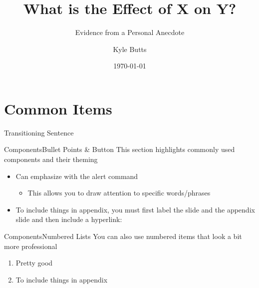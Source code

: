 \documentclass[aspectratio=43]{beamer}
\title{What is the Effect of X on Y?}
\subtitle{Evidence from a Personal Anecdote}
\date{\today}
\author{Kyle Butts}
\begin{document}
\begin{frame}
\maketitle

\end{frame}

\section{Common Items}

\begin{transitionframe}
Transitioning Sentence
\end{transitionframe}

\begin{frame}{Components}{Bullet Points \& Button}\label{main1}
    This section highlights commonly used components and their theming

    \begin{itemize}
        \item Can emphasize with \alert{the alert command}
        
        \begin{itemize}
            \item This allows you to draw attention to specific words/phrases
        \end{itemize}
        
        \item To include things in appendix, you must first label the slide and the appendix slide and then include a hyperlink:
        
        \vspace{5mm}
        \hyperlink{appendix1}{}
    \end{itemize}
\end{frame}

\begin{frame}{Components}{Numbered Lists}
    You can also use numbered items that look a bit more professional

    \begin{enumerate}
        \item Pretty good
        
        \item To include things in appendix
    \end{enumerate}
\end{frame}
\end{document}

